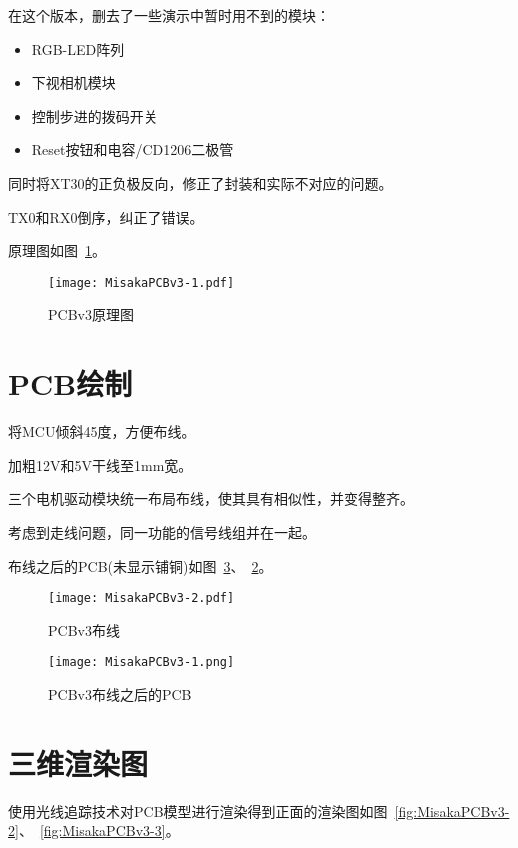 在这个版本，删去了一些演示中暂时用不到的模块：

\begin{itemize}
    \item RGB-LED阵列
    \item 下视相机模块
    \item 控制步进的拨码开关
    \item Reset按钮和电容/CD1206二极管
\end{itemize}

同时将XT30的正负极反向，修正了封装和实际不对应的问题。

TX0和RX0倒序，纠正了错误。

原理图如图~\ref{fig:MisakaPCBv3-sch}。

\begin{figure}[htbp]
    \centering
    \texttt{[image: MisakaPCBv3-1.pdf]}
    \caption{PCBv3原理图}
    \label{fig:MisakaPCBv3-sch}
\end{figure}

\section{PCB绘制}

将MCU倾斜45度，方便布线。

加粗12V和5V干线至1mm宽。

三个电机驱动模块统一布局布线，使其具有相似性，并变得整齐。

考虑到走线问题，同一功能的信号线组并在一起。


布线之后的PCB(未显示铺铜)如图~\ref{fig:MisakaPCBv3-1}、~\ref{fig:MisakaPCBv3}。

\begin{figure}[htbp]
    \centering
    \texttt{[image: MisakaPCBv3-2.pdf]}
    \caption{PCBv3布线}
    \label{fig:MisakaPCBv3}
\end{figure}

\begin{figure}[htbp]
    \centering
    \texttt{[image: MisakaPCBv3-1.png]}
    \caption{PCBv3布线之后的PCB}
    \label{fig:MisakaPCBv3-1}
\end{figure}

\section{三维渲染图}

使用光线追踪技术对PCB模型进行渲染得到正面的渲染图如图~\ref{fig:MisakaPCBv3-2}、~\ref{fig:MisakaPCBv3-3}。

